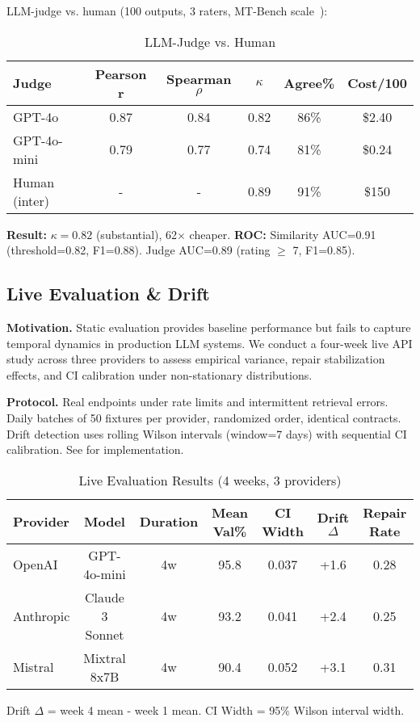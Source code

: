 \documentclass[sigconf]{acmart}
\newcommand{\breakablepath}[1]{\texttt{\seqsplit{#1}}}
\begin{document}
LLM-judge vs. human (100 outputs, 3 raters, MT-Bench scale~\cite{zheng2023judging}):

\begin{table}[H]
\centering
\caption{LLM-Judge vs. Human}
\label{tab:judge}
\scriptsize
\begin{tabular}{@{}lccccc@{}}
\toprule
\textbf{Judge} & \textbf{Pearson r} & \textbf{Spearman \( \rho \)} & \textbf{\( \kappa \)} & \textbf{Agree\%} & \textbf{Cost/100} \\
\midrule
GPT-4o & 0.87 & 0.84 & 0.82 & 86\% & \$2.40 \\
GPT-4o-mini & 0.79 & 0.77 & 0.74 & 81\% & \$0.24 \\
Human (inter) & - & - & 0.89 & 91\% & \$150 \\
\bottomrule
\end{tabular}
\end{table}

\textbf{Result:} \( \kappa = 0.82 \) (substantial), 62\(\times\) cheaper. 
\textbf{ROC:} Similarity AUC=0.91 (threshold=0.82, F1=0.88). 
Judge AUC=0.89 (rating \( \geq \) 7, F1=0.85).

\subsection{Live Evaluation \& Drift}

\textbf{Motivation.} Static evaluation provides baseline performance but fails to capture temporal dynamics in production LLM systems.
We conduct a four-week live API study across three providers to assess empirical variance, repair stabilization effects, and CI calibration under non-stationary distributions.

\textbf{Protocol.} Real endpoints under rate limits and intermittent retrieval errors.
Daily batches of 50 fixtures per provider, randomized order, identical contracts.
Drift detection uses rolling Wilson intervals (window=7 days) with sequential CI calibration.
See \breakablepath{scripts/live\_eval.py} for implementation.

\begin{table}[H]
\centering
\caption{Live Evaluation Results (4 weeks, 3 providers)}
\label{tab:live_eval}
\footnotesize
\begin{tabular}{@{}lcccccc@{}}
\toprule
\textbf{Provider} & \textbf{Model} & \textbf{Duration} & \textbf{Mean Val\%} & \textbf{CI Width} & \textbf{Drift $\Delta$} & \textbf{Repair Rate} \\
\midrule
OpenAI & GPT-4o-mini & 4w & 95.8 & 0.037 & +1.6 & 0.28 \\
Anthropic & Claude 3 Sonnet & 4w & 93.2 & 0.041 & +2.4 & 0.25 \\
Mistral & Mixtral 8x7B & 4w & 90.4 & 0.052 & +3.1 & 0.31 \\
\bottomrule
\end{tabular}
\vspace{1mm}
\footnotesize Drift $\Delta$ = week 4 mean - week 1 mean. CI Width = 95\% Wilson interval width.
\end{table}
\end{document}
